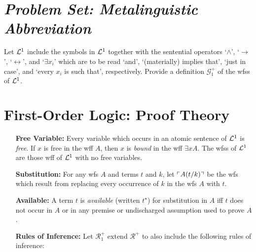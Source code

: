 \documentclass[a4paper, 11pt]{article} %
\begin{document}
\section*{\it Problem Set: Metalinguistic Abbreviation}

Let $\mathcal{L}^1$ include the symbols in $\mathcal{L}^1$ together with the sentential operators `$\wedge$', `$\rightarrow$', `$\leftrightarrow$', and `$\exists x_i$' which are to be read `and', `(materially) implies that', `just in case', and `every $x_i$ is such that', respectively. Provide a definition $\mathcal{G}_1^+$ of the wfss of $\mathcal{L}^1$.




\section*{\sc First-Order Logic: Proof Theory}

\begin{enumerate}[leftmargin=1.2in] %
	\item[\bf Free Variable:] Every variable which occurs in an atomic sentence of $\mathcal{L}^1$ is \textit{free}. If $x$ is free in the wff $A$, then $x$ is \textit{bound} in the wff $\exists xA$. The wfss of $\mathcal{L}^1$ are those wff of $\mathcal{L}^1$ with no free variables.
	\item[\bf Substitution:] For any wfs ${A}$ and terms $t$ and $k$, let $\ulcorner A(t/k)\urcorner$ be the wfs which result from replacing every occurrence of $k$ in the wfs ${A}$ with $t$.
	\item[\bf Available:] A term $t$ is \textit{available} (written $t^\star$) for substitution in ${A}$ iff $t$ does not occur in ${A}$ or in any premise or undischarged assumption used to prove $A$.
	\item[\bf Rules of Inference:] Let $\mathcal{R}_1^+$ extend $\mathcal{R}^+$ to also include the following rules of inference:%
\end{enumerate}
\end{document}

